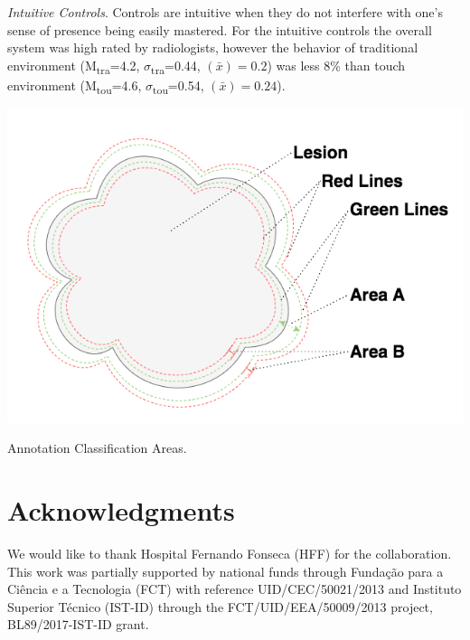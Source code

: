 \documentclass[sigchi-a, authorversion]{acmart}
\begin{document}
\textit{Intuitive Controls}. Controls are intuitive when they do not interfere with one's sense of presence being easily mastered. For the intuitive controls the overall system was high rated by radiologists, however the behavior of traditional environment (M\textsubscript{tra}=4.2, $\sigma$\textsubscript{tra}=0.44, {}$\left({\bar x}\right)=0.2$) was less 8\% than touch environment (M\textsubscript{tou}=4.6, $\sigma$\textsubscript{tou}=0.54, {}$\left({\bar x}\right)=0.24$).

\clearpage

\begin{marginfigure}
  \begin{center}
  \includegraphics[width=\marginparwidth]{mimbcd-ui_areas.png}
  \caption{Annotation Classification Areas.}
  \label{fig:Fig7}
  \end{center}
\end{marginfigure}


\section{Acknowledgments}

We would like to thank Hospital Fernando Fonseca (HFF) for the collaboration. This work was partially supported by national funds through Funda\c{c}\~{a}o para a Ci\^{e}ncia e a Tecnologia (FCT) with reference UID/CEC/50021/2013 and Instituto Superior T\'{e}cnico (IST-ID) through the FCT/UID/EEA/50009/2013 project, BL89/2017-IST-ID grant.



\end{document}
